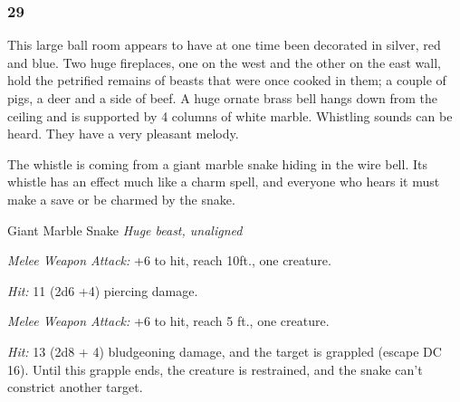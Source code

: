 \documentclass[palace_of_the_silver_princess]{subfiles}
\begin{document}
\subsubsection{29}
\begin{quotebox}
    This large ball room appears to have at one time been decorated in
    silver, red and blue. Two huge fireplaces, one on the west and the
    other on the east wall, hold the petrified remains of beasts that
    were once cooked in them; a couple of pigs, a deer and a side of
    beef. A huge ornate brass bell hangs down from the ceiling and is
    supported by 4 columns of white marble. Whistling sounds can be
    heard. They have a very pleasant melody.
\end{quotebox}

The whistle is coming from a giant marble snake hiding in the wire bell.
Its whistle has an effect much like a charm spell, and everyone who
hears it must make a save or be charmed by the snake.

\begin{monsterbox}{Giant Marble Snake}
	\textit{Huge beast, unaligned}\\
	\hline
	\basics[
		armorclass = {12},
		hitpoints = {60 (8d12 + 8)},
		speed = {30~ft., swim 30~ft.}]
	\hline
	\stats[
		STR = \stat{19},
		DEX = \stat{14},
		CON = \stat{12},
		INT = \stat{1},
		WIS = \stat{10},
		CHA = \stat{3}]
	\hline
	\details[
        skills = {Perception +2},
		senses = {blindsight 10~ft.passive Perception 12},
        languages = {---},
		challenge = {2 (450 XP)}]
	\hline

    \begin{monsteraction}[Bite]
		\textit{Melee Weapon Attack:} +6 to hit, reach 10ft., one
        creature.

        \textit{Hit:} 11 (2d6 +4) piercing damage.
	\end{monsteraction}

    \begin{monsteraction}[Constrict]
        \textit{Melee Weapon Attack:} +6 to hit, reach 5 ft., one
        creature. 

        \textit{Hit:} 13 (2d8 + 4) bludgeoning damage, and the target is
        grappled (escape DC 16). Until this grapple ends, the creature
        is restrained, and the snake can't constrict another target.
    \end{monsteraction}
\end{monsterbox}
\end{document}

